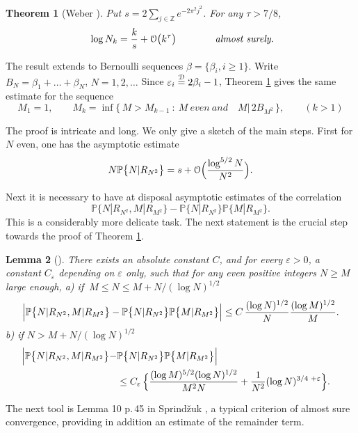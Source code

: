 \documentclass[11pt,draft,reqno]{amsart}
\newtheorem{theorem}{Theorem}[section]
\newtheorem{lemma}[theorem]{Lemma}
\theoremstyle{definition}
\theoremstyle{remarks}
\numberwithin{equation}{section}
\def \b{{\beta}}
\def \e{{\varepsilon}}
\def\P{{\mathcal P}}
\def\P{{\mathbb P}}
\def\Z{{\mathbb Z}}
\begin{document}
\begin{theorem}[Weber \cite{W6}]\label{NkRn} Put $s= 2 \sum_{j\in \Z}  e^{-2\pi^2j^2}$. For any $\tau>7/8$,
$$ \     \log N_k = {k\over s} + {\mathcal O}\big(  k^{\tau} \big) \qquad\qquad  \hbox{\it almost surely.} $$
\end{theorem}
 
  The result extends to Bernoulli sequences $\b= \{\b_i , i\ge 1\}$. Write $B_N  = \b_1+\ldots +\b_N$, $N=1,2,\ldots$ Since $
\e_i\buildrel{{\mathcal D}}\over{=}2\b_i-1 $, Theorem \ref{NkRn} gives the same estimate for the sequence 
 $$ M_1 =1, \qquad M_k =\inf\{\, M>M_{k-1}  \ :\ M\  \textstyle{even \  and} \quad M | \,2B_{M^2} \, \},\qquad(k>1) $$
 
The proof is intricate and  long.  We only give a sketch of the main steps. First for $N$ even,  one has the asymptotic estimate
\begin{equation}N\P\big\{ N | R_{N^2}\big\} = s + {\mathcal O}\Big( { \log^{5/2} N  \over N^2}\Big) . 
\end{equation}

  Next  it is   necessary to have at disposal asymptotic estimates of  
  the
correlation 
$$\P \{ N | R_{N^2},  M | R_{M^2} \} - \P \{  N |
R_{N^2} \}\P \{  M | R_{M^2} \}.$$
This is a considerably more   delicate task.
The next
statement is the crucial step towards the proof of Theorem \ref{NkRn}.
\begin{lemma}[\cite{W6}] \label{NkRnl2}
There exists an absolute constant
$C$, and for every $\e >0$, a constant $C_\e$ depending on $\e$ only, such that for any even positive  integers
$N\ge M$ large enough,
\vskip 3pt a) if $\  M\le N\le M+  N/(\log N)^{1/2}$ 
 \begin{align*} \Big|\P\big\{ N | R_{N^2},  M | R_{M^2}\big\}- \P\big\{  N |
R_{N^2}\big\}\P\big\{  M | R_{M^2}\big\}\Big|\le C\,{(\log N)^{1/2}\over N } {(\log M)^{1/2}\over M}
.\end{align*}
\vskip 3pt  b) if $  N>  M+  N/(\log N)^{1/2}$ 
\begin{align*}  \Big|\P\big\{ N | R_{N^2},  M | R_{M^2}\big\}-& \P\big\{  N |
R_{N^2}\big\}\P\big\{  M | R_{M^2}\big\}\Big|
\cr &\le C_\e\,\Big\{  {(\log M)^{5/2}(\log N)^{1/2}\over M^2N}+ {1\over N^2}(\log
N)^{3/4\, \,+\e} \Big\}.
\end{align*}
\end{lemma}

The next tool is Lemma 10 p.\,45  in Sprind\v zuk \cite{Sp}, a typical criterion of almost sure convergence, providing  in addition an estimate of the  remainder term. %
\end{document}
